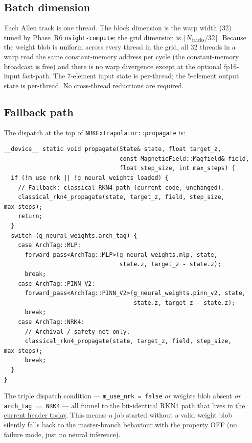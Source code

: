 \documentclass[11pt,a4paper]{article}
\newcommand{\code}[1]{\texttt{#1}}
\begin{document}
\subsection{Batch dimension}
\label{sec:kernel-batch}

Each Allen track is one thread. The block dimension is the warp width
(32) tuned by Phase~R6 \code{nsight-compute}; the grid dimension is
$\lceil N_\text{tracks} / 32 \rceil$. Because the weight blob is uniform
across every thread in the grid, all 32 threads in a warp read the same
constant-memory address per cycle (the constant-memory broadcast is
free) and there is no warp divergence except at the optional fp16-input
fast-path. The 7-element input state is per-thread; the 5-element output
state is per-thread. No cross-thread reductions are required.

\subsection{Fallback path}
\label{sec:kernel-fallback}

The dispatch at the top of \code{NRKExtrapolator::propagate} is:

\begin{verbatim}
__device__ static void propagate(State& state, float target_z,
                                 const MagneticField::Magfield& field,
                                 float step_size, int max_steps) {
  if (!m_use_nrk || !g_neural_weights_loaded) {
    // Fallback: classical RKN4 path (current code, unchanged).
    classical_rkn4_propagate(state, target_z, field, step_size, max_steps);
    return;
  }
  switch (g_neural_weights.arch_tag) {
    case ArchTag::MLP:
      forward_pass<ArchTag::MLP>(g_neural_weights.mlp, state,
                                 state.z, target_z - state.z);
      break;
    case ArchTag::PINN_V2:
      forward_pass<ArchTag::PINN_V2>(g_neural_weights.pinn_v2, state,
                                     state.z, target_z - state.z);
      break;
    case ArchTag::NRK4:
      // Archival / safety net only.
      classical_rkn4_propagate(state, target_z, field, step_size, max_steps);
      break;
  }
}
\end{verbatim}

The triple dispatch condition --- \code{m\_use\_nrk = false} \emph{or}
weights blob absent \emph{or} \code{arch\_tag == NRK4} --- all funnel to
the bit-identical RKN4 path that lives in
\href{run:../../../TE_stack/Allen/device/kalman/ParKalman/include/NRKExtrapolator.cuh}{the current header today}.
This means: a job started without a valid weight blob silently falls
back to the master-branch behaviour with the property OFF (no failure
mode, just no neural inference).
\end{document}

